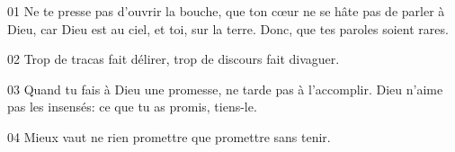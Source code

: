 01 Ne te presse pas d’ouvrir la bouche, que ton cœur ne se hâte pas de parler à Dieu, car Dieu est au ciel, et toi, sur la terre. Donc, que tes paroles soient rares.

02 Trop de tracas fait délirer, trop de discours fait divaguer.

03 Quand tu fais à Dieu une promesse, ne tarde pas à l’accomplir. Dieu n’aime pas les insensés: ce que tu as promis, tiens-le.

04 Mieux vaut ne rien promettre que promettre sans tenir.
